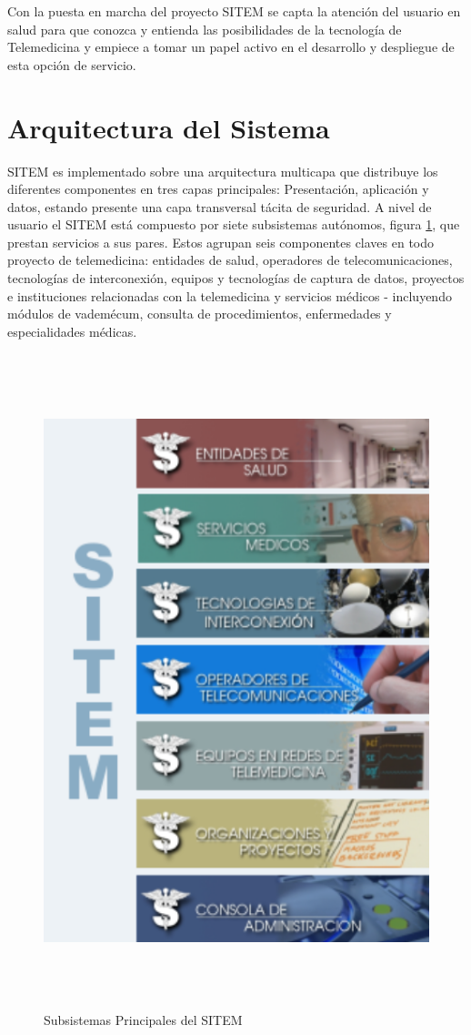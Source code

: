 Con la puesta en marcha del proyecto SITEM se capta la atención del usuario en salud para que conozca y entienda las posibilidades de la tecnología de Telemedicina y empiece a tomar un papel activo en el desarrollo y despliegue de esta opción de servicio.

\section{Arquitectura del Sistema}

SITEM es implementado sobre una arquitectura multicapa que distribuye los diferentes componentes en tres capas principales: Presentación, aplicación y datos, estando presente una capa transversal tácita de seguridad. A nivel de usuario el SITEM está compuesto por siete subsistemas autónomos, figura \ref{componentes_sitem}, que prestan servicios a sus pares. Estos agrupan seis componentes claves en todo proyecto de telemedicina: entidades de salud, operadores de telecomunicaciones, tecnologías de interconexión, equipos y tecnologías de captura de datos, proyectos e instituciones relacionadas con la telemedicina y servicios médicos - incluyendo módulos de vademécum, consulta de procedimientos, enfermedades y especialidades médicas.

\begin{figure}
 \centering
 \includegraphics[width=140mm, height=190mm]{componentes_sitem.png}
 \caption{Subsistemas Principales del SITEM}
 \label{componentes_sitem}
\end{figure}


